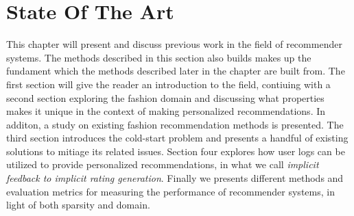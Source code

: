 
\chapter{State Of The Art}
\minitoc
\label{chap:SotA}

This chapter will present and discuss previous work in the field of recommender
systems. The methods described in this section also builds makes up the
fundament which the methods described later in the chapter are built from.  The
first section will give the reader an introduction to the field, contiuing with
a second section exploring the fashion domain and discussing what properties
makes it unique in the context of making personalized recommendations. In
additon, a study on existing fashion recommendation methods is presented.  The
third section introduces the cold-start problem and presents a handful of
existing solutions to mitiage its related issues. Section four explores how
user logs can be utilized to provide personalized recommendations, in what we
call \textit{implicit feedback to implicit rating generation}. Finally we
presents different methods and evaluation metrics for measuring the performance
of recommender systems, in light of both sparsity and domain.

\restoregeometry

\clearpage






